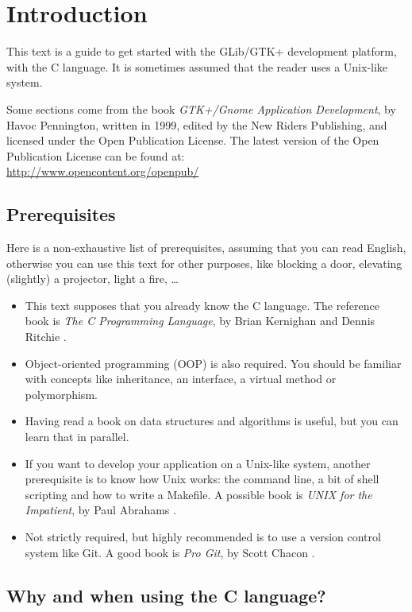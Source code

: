 \chapter{Introduction}

This text is a guide to get started with the GLib/GTK+ development platform, with the C language. It is sometimes assumed that the reader uses a Unix-like system.

Some sections come from the book \emph{GTK+/Gnome Application Development}, by Havoc Pennington, written in 1999, edited by the New Riders Publishing, and licensed under the Open Publication License. The latest version of the Open Publication License can be found at:\\
\url{http://www.opencontent.org/openpub/}

\section{Prerequisites}

Here is a non-exhaustive list of prerequisites, assuming that you can read English, otherwise you can use this text for other purposes, like blocking a door, elevating (slightly) a projector, light a fire, …

\begin{itemize}
  \item This text supposes that you already know the C language. The reference book is \emph{The C Programming Language}, by Brian Kernighan and Dennis Ritchie \cite{k-r-book}.
  \item Object-oriented programming (OOP) is also required. You should be familiar with concepts like inheritance, an interface, a virtual method or polymorphism.
  \item Having read a book on data structures and algorithms is useful, but you can learn that in parallel.
  \item If you want to develop your application on a Unix-like system, another prerequisite is to know how Unix works: the command line, a bit of shell scripting and how to write a Makefile. A possible book is \emph{UNIX for the Impatient}, by Paul Abrahams \cite{unix-impatient}.
  \item Not strictly required, but highly recommended is to use a version control system like Git. A good book is \emph{Pro Git}, by Scott Chacon \cite{pro-git}.
\end{itemize}
 
\section{Why and when using the C language?}

